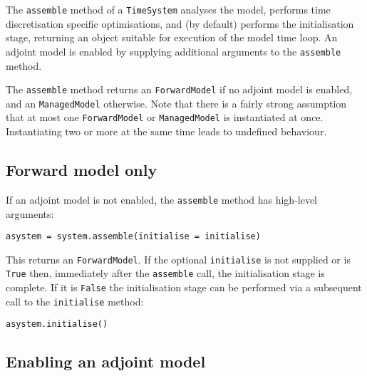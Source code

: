 \documentclass[a4paper]{book}
\begin{document}
The \verb+assemble+ method of a \verb+TimeSystem+ analyses the model, performs
time discretisation specific optimisations, and (by default) performs the
initialisation stage, returning an object suitable for execution of the model
time loop. An adjoint model is enabled by supplying additional arguments to the
\verb+assemble+ method.

The \verb+assemble+ method returns an \verb+ForwardModel+ if no adjoint model is
enabled, and an \verb+ManagedModel+ otherwise. Note that there is a fairly
strong assumption that at most one \verb+ForwardModel+ or
\verb+ManagedModel+ is instantiated at once. Instantiating two or more at the
same time leads to undefined behaviour.

\subsection{Forward model only}\label{sect:forward_assembly}

If an adjoint model is not enabled, the \verb+assemble+ method has high-level
arguments:
\begin{lstlisting}
asystem = system.assemble(initialise = initialise)
\end{lstlisting}
This returns an \verb+ForwardModel+. If the optional \verb+initialise+ is not
supplied or is \verb+True+ then, immediately after the \verb+assemble+ call, the
initialisation stage is complete. If it is \verb+False+ the initialisation stage
can be performed via a subsequent call to the \verb+initialise+ method:
\begin{lstlisting}
asystem.initialise()
\end{lstlisting}

\subsection{Enabling an adjoint model}\label{sect:adjoint_assembly}
\end{document}
